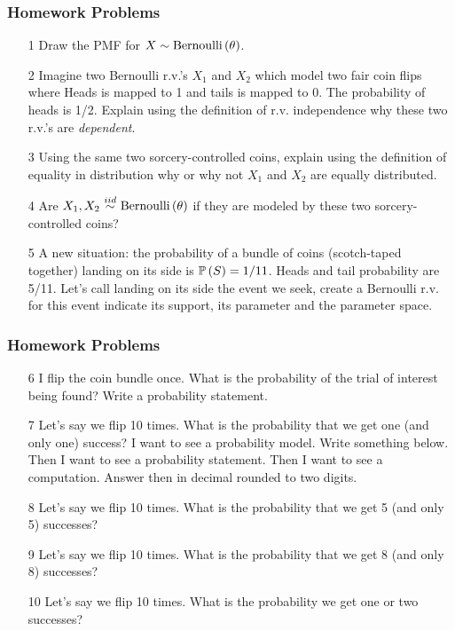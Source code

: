 \documentclass[slides]{beamer} %
\begin{document}
\begin{frame}
	\frametitle{Homework Problems}
\begin{enumerate}
\item[1] Draw the PMF for $X \sim \mathrm{Bernoulli}\left(\theta\right)$. 
\item[2] Imagine two Bernoulli r.v.'s $X_1$ and $X_2$ which model two fair coin flips where Heads is mapped to 1 and tails is mapped to 0. The probability of heads is 1/2. Explain using the definition of r.v. independence why these two r.v.'s are \textit{dependent}.
\item[3] Using the same two sorcery-controlled coins, explain using the definition of equality in distribution why or why not $X_1$ and $X_2$ are equally distributed.
\item[4] Are $X_1, X_2 \iid \bernoulli{\theta}$ if they are modeled by these two sorcery-controlled coins?
\item[5] A new situation: the probability of a bundle of coins (scotch-taped together) landing on its side is $\mathbb{P}\left(S\right) = 1/11$. Heads and tail probability are 5/11. Let's call landing on its side the event we seek, create a Bernoulli r.v. for this event indicate its support, its parameter and the parameter space.
\end{enumerate}
\end{frame}	

\begin{frame}
	\frametitle{Homework Problems}
\begin{enumerate}

\item[6]  I flip the coin bundle once. What is the probability of the trial of interest being found? Write a probability statement.
\item[7]  Let's say we flip 10 times. What is the probability that we get one (and only one) success? I want to see a probability model.  Write  something below. Then I want to see a probability statement. Then I want to see a computation. Answer then in decimal rounded to two digits. 
\item[8] Let's say we flip 10 times. What is the probability that we get 5 (and only 5) successes?  
\item[9]  Let's say we flip 10 times. What is the probability that we get 8 (and only 8) successes?  
\item[10] Let's say we flip 10 times. What is the probability we get one or two successes?  

\end{enumerate}
\end{frame}	
\end{document}
